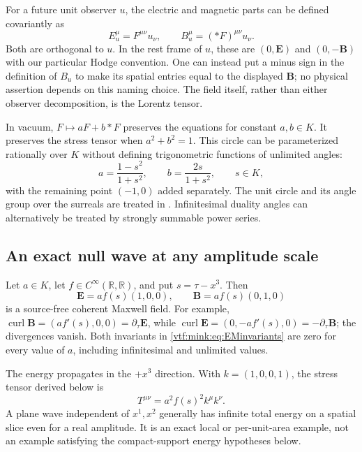 \documentclass[11pt,letterpaper]{article}
\theoremstyle{definition}
\theoremstyle{remark}
\newcommand{\R}{\mathbb R}\newcommand{\C}{\mathbb C}
\newcommand{\curl}{\operatorname{curl}}
\begin{document}
For a future unit observer $u$, the electric and magnetic parts can be defined covariantly as
\begin{equation}
 E_u^\mu=F^{\mu\nu}u_\nu,
 \qquad B_u^\mu=(* F)^{\mu\nu}u_\nu.
\end{equation}
Both are orthogonal to $u$. In the rest frame of $u$, these are $(0,\mathbf E)$ and $(0,-\mathbf B)$ with our particular Hodge convention. One can instead put a minus sign in the definition of $B_u$ to make its spatial entries equal to the displayed $\mathbf B$; no physical assertion depends on this naming choice. The field itself, rather than either observer decomposition, is the Lorentz tensor.

In vacuum, $F\mapsto aF+b* F$ preserves the equations for constant $a,b\in K$. It preserves the stress tensor when $a^2+b^2=1$. This circle can be parameterized rationally over $K$ without defining trigonometric functions of unlimited angles:
\begin{equation}
 a=\frac{1-s^2}{1+s^2},\qquad b=\frac{2s}{1+s^2},\qquad s\in K,
\end{equation}
with the remaining point $(-1,0)$ added separately. The unit circle and its
angle group over the surreals are treated in . Infinitesimal duality angles can alternatively be treated by strongly summable power series.

\subsection{An exact null wave at any amplitude scale}\label{vtf:mink:sub:planewave}
Let $a\in K$, let $f\in C^\infty(\R,\R)$, and put $s=\tau-x^3$. Then
\begin{equation}\label{vtf:mink:eq:nullwave}
 \mathbf E=a f(s)(1,0,0),\qquad
 \mathbf B=a f(s)(0,1,0)
\end{equation}
is a source-free coherent Maxwell field. For example,
$\curl\mathbf B=(a f'(s),0,0)=\partial_\tau\mathbf E$, while
$\curl\mathbf E=(0,-a f'(s),0)=-\partial_\tau\mathbf B$; the divergences vanish. Both invariants in \cref{vtf:mink:eq:EMinvariants} are zero for every value of $a$, including infinitesimal and unlimited values.

The energy propagates in the $+x^3$ direction. With $k=(1,0,0,1)$, the stress tensor derived below is
\begin{equation}
 T^{\mu\nu}=a^2f(s)^2k^\mu k^\nu.
\end{equation}
A plane wave independent of $x^1,x^2$ generally has infinite total energy on a spatial slice even for a real amplitude. It is an exact local or per-unit-area example, not an example satisfying the compact-support energy hypotheses below.
\end{document}
